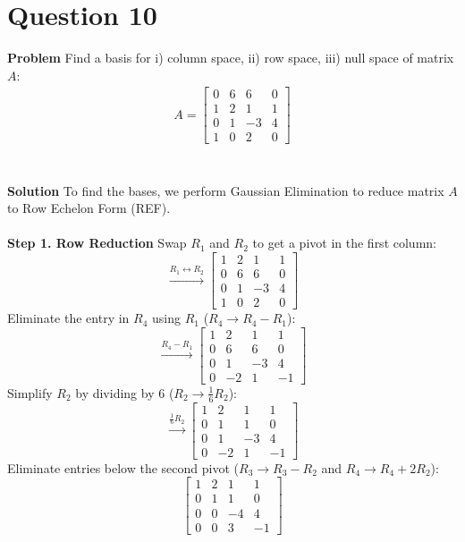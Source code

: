 \documentclass{article}
\begin{document}
\section{Question 10}
\textbf{Problem}
Find a basis for i) column space, ii) row space, iii) null space of matrix $A$:
\begin{align*}
	A =
	\begin{bmatrix}
		0 & 6 & 6  & 0 \\
		1 & 2 & 1  & 1 \\
		0 & 1 & -3 & 4 \\
		1 & 0 & 2  & 0
	\end{bmatrix}
\end{align*}
\\
\\
\textbf{Solution}
To find the bases, we perform Gaussian Elimination to reduce matrix $A$ to Row Echelon Form (REF).
\\
\\
\textbf{Step 1. Row Reduction}
Swap $R_{1}$ and $R_{2}$ to get a pivot in the first column:
\[
	\xrightarrow{R_{1} \leftrightarrow R_{2}}
	\begin{bmatrix}
		1 & 2 & 1  & 1 \\
		0 & 6 & 6  & 0 \\
		0 & 1 & -3 & 4 \\
		1 & 0 & 2  & 0
	\end{bmatrix}
\]
Eliminate the entry in $R_{4}$ using $R_{1}$ ($R_{4} \to R_{4} - R_{1}$):
\[
	\xrightarrow{R_{4} - R_{1}}
	\begin{bmatrix}
		1 & 2  & 1  & 1  \\
		0 & 6  & 6  & 0  \\
		0 & 1  & -3 & 4  \\
		0 & -2 & 1  & -1
	\end{bmatrix}
\]
Simplify $R_{2}$ by dividing by 6 ($R_{2} \to \frac{1}{6}R_{2}$):
\[
	\xrightarrow{\frac{1}{6}R_{2}}
	\begin{bmatrix}
		1 & 2  & 1  & 1  \\
		0 & 1  & 1  & 0  \\
		0 & 1  & -3 & 4  \\
		0 & -2 & 1  & -1
	\end{bmatrix}
\]
Eliminate entries below the second pivot ($R_{3} \to R_{3} - R_{2}$ and
$R_{4} \to R_{4} + 2R_{2}$):
\[
	\begin{bmatrix}
		1 & 2 & 1  & 1  \\
		0 & 1 & 1  & 0  \\
		0 & 0 & -4 & 4  \\
		0 & 0 & 3  & -1
	\end{bmatrix}
\]
\end{document}

